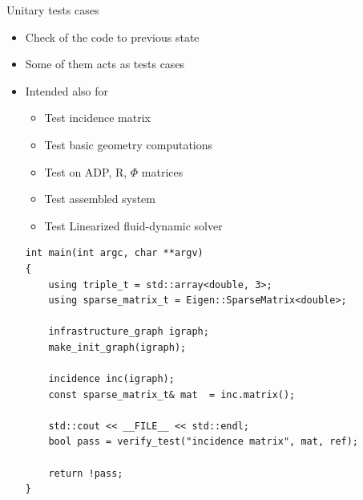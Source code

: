 \begin{frame}[fragile]{Unitary tests cases}

\begin{itemize}
    \item Check   of the code to previous state
    \item Some of them acts as  tests cases
    \item Intended also for 

\begin{center}
\begin{minipage}{0.45\textwidth}
        \begin{itemize}
            \item Test incidence matrix
            \item Test basic geometry computations
            \item Test on ADP, R, $\Phi$ matrices
            \item Test assembled system
            \item Test Linearized fluid-dynamic solver
        \end{itemize}
\end{minipage}%
\hfill
\begin{minipage}{0.45\textwidth}
\begin{verbatim}
int main(int argc, char **argv)
{
    using triple_t = std::array<double, 3>;
    using sparse_matrix_t = Eigen::SparseMatrix<double>; 
    
    infrastructure_graph igraph;
    make_init_graph(igraph);

    incidence inc(igraph);
    const sparse_matrix_t& mat  = inc.matrix();

    std::cout << __FILE__ << std::endl;
    bool pass = verify_test("incidence matrix", mat, ref);
    
    return !pass; 
}
\end{verbatim}    
\end{minipage}%
\end{center}
\end{itemize}
\end{frame}
